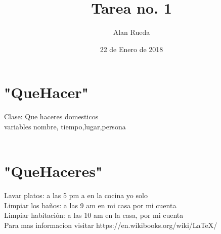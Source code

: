 \documentclass[8pt, a4paper]{article} %
\author{Alan Rueda} %
\date{22 de Enero de 2018} %
\begin{document}
  \title{Tarea no. 1} %
   \maketitle %
   
    \section{"QueHacer"} %
      Clase: Que haceres domesticos\\ 
      variables nombre, tiempo,lugar,persona\\
           \\ 
          
    \section{"QueHaceres"} %
    \begin{sloppypar} %
     Lavar platos: a las 5 pm a en la cocina yo solo\\
     Limpiar los baños: a las 9 am en mi casa por mi cuenta\\
     Limpiar habitación: a las 10 am en la casa, por mi cuenta\\
     Para mas informacion visitar https://en.wikibooks.org/wiki/LaTeX/
    \end{sloppypar}  
    
        
\end{document}
